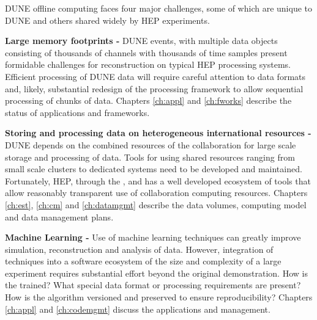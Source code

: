 \documentclass[../main-v1.tex]{subfiles}
\begin{document}
DUNE offline computing faces four major challenges, some of which are unique to DUNE and others shared widely by HEP experiments.  

\begin{description}
\item{\bf Large memory footprints -}  DUNE events, with multiple data objects consisting of  thousands of channels with thousands of time samples   present formidable challenges for reconstruction on typical HEP processing systems. Efficient processing of DUNE data will require careful attention to data formats and, likely, substantial redesign of the processing framework to allow sequential processing of chunks of data.  Chapters \ref{ch:appl} and \ref{ch:fworks} describe the status of applications and frameworks. 

\item{\bf Storing and processing data on heterogeneous international  resources -} DUNE depends on the combined resources of the collaboration for large scale storage and processing of data.   Tools for using shared resources ranging from small scale clusters to dedicated  systems need to be developed and maintained.   Fortunately, HEP, through the ,  and   has a well developed ecosystem of tools that allow reasonably transparent use of collaboration computing resources.  Chapters \ref{ch:est},  \ref{ch:cm} and \ref{ch:datamgmt} describe the data volumes, computing model and data management plans. 

\item{
\bf Machine Learning - }  Use of machine learning techniques can greatly improve simulation, reconstruction and analysis of data. However, integration of  techniques into a software ecosystem of the size and complexity of a large  experiment requires substantial effort beyond the original demonstration.  How is the  trained?  What special data format or processing requirements are present? How is the algorithm versioned and preserved to ensure reproducibility?   Chapters \ref{ch:appl} and \ref{ch:codemgmt} discuss the applications and management.


\end{description}
\end{document}
